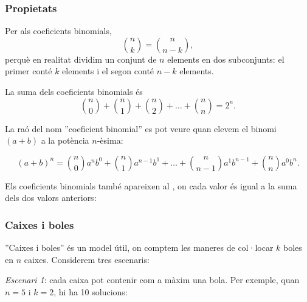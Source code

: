 \subsubsection{Propietats}

Per als coeficients binomials,
\[
{n \choose k}  =  {n \choose n-k},
\]
perquè en realitat dividim un conjunt de $n$ elements en dos
subconjunts: el primer conté $k$ elements i el segon conté $n-k$
elements.

La suma dels coeficients binomials és
\[
{n \choose 0}+{n \choose 1}+{n \choose 2}+\ldots+{n \choose n}=2^n.
\]

La raó del nom ''coeficient binomial'' es pot veure quan elevem el binomi
$(a+b)$ a la potència $n$-èsima:

\[ (a+b)^n = {n \choose 0} a^nb^0 + {n \choose 1} a^{n-1} b^1 + \ldots + {n \choose n-1} a^1 b^{n-1} + {n \choose n} a^0 b^n. \]


Els coeficients binomials també apareixen al ,
on cada valor és igual a la suma dels dos valors anteriors:
\begin{center}
\end{center}


\subsubsection{Caixes i boles}

''Caixes i boles'' és un model útil, on comptem les maneres de
col·locar $k$ boles en $n$ caixes. Considerem tres escenaris:

\textit{Escenari 1}: cada caixa pot contenir com a màxim una bola. Per
exemple, quan $n=5$ i $k=2$, hi ha 10 solucions:


